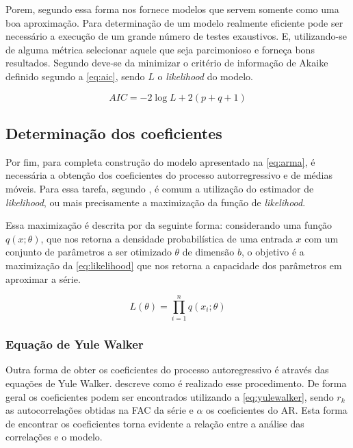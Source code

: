 \documentclass[
    12pt,
    oneside,
    a4paper,
    english,
    brazil
]{abntex2}
\begin{document}
Porem, segundo   essa  forma nos  fornece modelos  que servem
somente  como uma  boa aproximação.  Para determinação  de um  modelo realmente
eficiente  pode  ser necessário  a  execução  de  um  grande número  de  testes
exaustivos.  E, utilizando-se  de  alguma métrica  selecionar  aquele que  seja
parcimonioso  e  forneça  bons  resultados.  Segundo    deve-se
da  minimizar   o  critério  de   informação  de  Akaike  definido   segundo  a
\autoref{eq:aic}, sendo $L$ o \textit{likelihood} do modelo.

\begin{equation}
    \label{eq:aic}
    AIC = -2\log{L}+2(p+q+1)
\end{equation}

\subsection{Determinação dos coeficientes}

Por fim, para completa construção do modelo apresentado na \autoref{eq:arma}, é
necessária a obtenção dos coeficientes  do processo autorregressivo e de médias
móveis. Para essa  tarefa, segundo , é comum  a utilização do
estimador de \textit{likelihood}, ou mais  precisamente a maximização da função
de \textit{likelihood}.

Essa  maximização   é  descrita   por     da  seguinte
forma:  considerando  uma função  $q(x;\theta)$, que  nos retorna  a  densidade
probabilística de uma entrada $x$ com um conjunto de parâmetros a ser otimizado
$\theta$ de dimensão $b$, o objetivo é a maximização da \autoref{eq:likelihood}
que nos retorna a capacidade dos parâmetros em aproximar a série.

\begin{equation}\label{eq:likelihood}
    L(\theta) = \prod_{i=1}^{n}{q(x_i;\theta)}
\end{equation}

\subsubsection{Equação de Yule Walker}

Outra forma de  obter os coeficientes do processo autoregressivo  é através das
equações  de Yule  Walker.   descreve como  é realizado  esse
procedimento. De forma geral os coeficientes podem ser encontrados utilizando a
\autoref{eq:yulewalker}, sendo $r_k$ as autocorrelações obtidas na FAC da série
e $\alpha$  os coeficientes do  AR\@. Esta  forma de encontrar  os coeficientes
torna evidente a relação entre a análise das correlações e o modelo.
\end{document}
